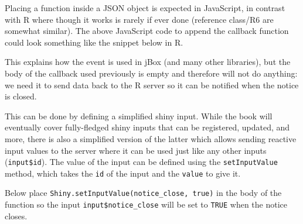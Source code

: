 \documentclass[
]{krantz}
\makeatletter
\newenvironment{Shaded}{\begin{snugshade}}{\end{snugshade}}
\newcommand{\CommentTok}[1]{\textcolor[rgb]{0.37,0.37,0.37}{\textit{#1}}}
\newcommand{\ControlFlowTok}[1]{\textcolor[rgb]{0.27,0.27,0.27}{\textbf{#1}}}
\newcommand{\DataTypeTok}[1]{\textcolor[rgb]{0.27,0.27,0.27}{#1}}
\newcommand{\KeywordTok}[1]{\textcolor[rgb]{0.27,0.27,0.27}{\textbf{#1}}}
\newcommand{\NormalTok}[1]{#1}
\newcommand{\OperatorTok}[1]{\textcolor[rgb]{0.43,0.43,0.43}{\textbf{#1}}}
\newcommand{\StringTok}[1]{\textcolor[rgb]{0.5,0.5,0.5}{#1}}
\newenvironment{kframe}{%
\medskip{}
\setlength{\fboxsep}{.8em}
 \def\at@end@of@kframe{}%
 \ifinner\ifhmode%
  \def\at@end@of@kframe{\end{minipage}}%
  \begin{minipage}{\columnwidth}%
 \fi\fi%
 \def\FrameCommand##1{\hskip\@totalleftmargin \hskip-\fboxsep
 \colorbox{shadecolor}{##1}\hskip-\fboxsep
     \hskip-\linewidth \hskip-\@totalleftmargin \hskip\columnwidth}%
 \MakeFramed {\advance\hsize-\width
   \@totalleftmargin\z@ \linewidth\hsize
   \@setminipage}}%
 {\par\unskip\endMakeFramed%
 \at@end@of@kframe}
\renewenvironment{Shaded}{\begin{kframe}}{\end{kframe}}
\makeatother
\begin{document}
Placing a function inside a JSON object is expected in JavaScript, in contrast with R where though it works is rarely if ever done (reference class/R6 are somewhat similar). The above JavaScript code to append the callback function could look something like the snippet below in R.

\begin{Shaded}
\end{Shaded}

This explains how the event is used in jBox (and many other libraries), but the body of the callback used previously is empty and therefore will not do anything: we need it to send data back to the R server so it can be notified when the notice is closed.

This can be done by defining a simplified shiny input. While the book will eventually cover fully-fledged shiny inputs that can be registered, updated, and more, there is also a simplified version of the latter which allows sending reactive input values to the server where it can be used just like any other inputs (\texttt{input\$id}). The value of the input can be defined using the \texttt{setInputValue} method, which takes the \texttt{id} of the input and the \texttt{value} to give it.

Below place \texttt{Shiny.setInputValue(\textquotesingle{}notice\_close\textquotesingle{},\ true)} in the body of the function so the input \texttt{input\$notice\_close} will be set to \texttt{TRUE} when the notice closes.

\begin{Shaded}
\end{Shaded}
\end{document}
